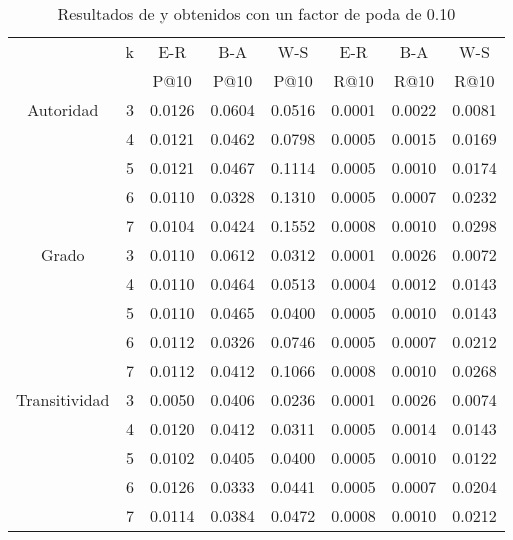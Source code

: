 \begin{table}[htbp]
\begin{center}
\begin{tabular}{|l|r|r|r|r|r|r|r|}
\hline

\multicolumn{ 1}{|l|}{} & \multicolumn{ 1}{c|}{k} & \multicolumn{ 1}{c|}{E-R} & \multicolumn{ 1}{c|}{B-A} & \multicolumn{ 1}{c|}{W-S} & \multicolumn{ 1}{c|}{E-R} & \multicolumn{ 1}{c|}{B-A} & \multicolumn{ 1}{c|}{W-S} \\

\multicolumn{ 1}{|l|}{} & \multicolumn{ 1}{l|}{} & \multicolumn{ 1}{c|}{P@10} & \multicolumn{ 1}{c|}{P@10} & \multicolumn{ 1}{c|}{P@10} & \multicolumn{ 1}{c|}{R@10} & \multicolumn{ 1}{c|}{R@10} & \multicolumn{ 1}{c|}{R@10} \\



\hline\hline
\multicolumn{ 1}{|c|}{Autoridad} & 3 & 0.0126 & 0.0604 & 0.0516 & 0.0001 & 0.0022 & 0.0081 \\ \cline{ 2- 8}
\multicolumn{ 1}{|l|}{} & 4 & 0.0121 & 0.0462 & 0.0798 & 0.0005 & 0.0015 & 0.0169 \\ \cline{ 2- 8}
\multicolumn{ 1}{|l|}{} & 5 & 0.0121 & 0.0467 & 0.1114 & 0.0005 & 0.0010 & 0.0174 \\ \cline{ 2- 8}
\multicolumn{ 1}{|l|}{} & 6 & 0.0110 & 0.0328 & 0.1310 & 0.0005 & 0.0007 & 0.0232 \\ \cline{ 2- 8}
\multicolumn{ 1}{|l|}{} & 7 & 0.0104 & 0.0424 & 0.1552 & 0.0008 & 0.0010 & 0.0298 \\ \hline \hline
\multicolumn{ 1}{|c|}{Grado} & 3 & 0.0110 & 0.0612 & 0.0312 & 0.0001 & 0.0026 & 0.0072 \\ \cline{ 2- 8}
\multicolumn{ 1}{|l|}{} & 4 & 0.0110 & 0.0464 & 0.0513 & 0.0004 & 0.0012 & 0.0143 \\ \cline{ 2- 8}
\multicolumn{ 1}{|l|}{} & 5 & 0.0110 & 0.0465 & 0.0400 & 0.0005 & 0.0010 & 0.0143 \\ \cline{ 2- 8}
\multicolumn{ 1}{|l|}{} & 6 & 0.0112 & 0.0326 & 0.0746 & 0.0005 & 0.0007 & 0.0212 \\ \cline{ 2- 8}
\multicolumn{ 1}{|l|}{} & 7 & 0.0112 & 0.0412 & 0.1066 & 0.0008 & 0.0010 & 0.0268 \\ \hline \hline
\multicolumn{ 1}{|c|}{Transitividad} & 3 & 0.0050 & 0.0406 & 0.0236 & 0.0001 & 0.0026 & 0.0074 \\ \cline{ 2- 8}
\multicolumn{ 1}{|l|}{} & 4 & 0.0120 & 0.0412 & 0.0311 & 0.0005 & 0.0014 & 0.0143 \\ \cline{ 2- 8}
\multicolumn{ 1}{|l|}{} & 5 & 0.0102 & 0.0405 & 0.0400 & 0.0005 & 0.0010 & 0.0122 \\ \cline{ 2- 8}
\multicolumn{ 1}{|l|}{} & 6 & 0.0126 & 0.0333 & 0.0441 & 0.0005 & 0.0007 & 0.0204 \\ \cline{ 2- 8}
\multicolumn{ 1}{|l|}{} & 7 & 0.0114 & 0.0384 & 0.0472 & 0.0008 & 0.0010 & 0.0212 \\ \hline
\end{tabular}
\caption{Resultados de  y  obtenidos con un factor de poda de 0.10}
\label{tbl-pr10}
\end{center}
\end{table}




